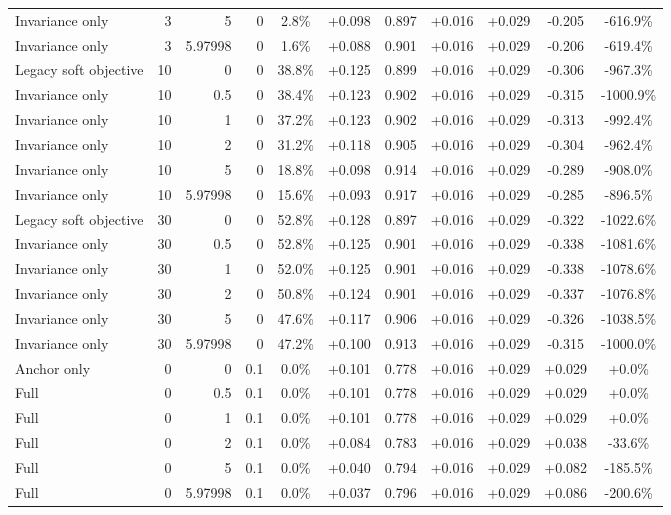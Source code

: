 \begin{table}[htbp]
\begin{tabular}{lrrrccccccc}
Invariance only & 3 & 5 & 0 & 2.8\% & +0.098 & 0.897 & +0.016 & +0.029 & -0.205 & -616.9\% \\
Invariance only & 3 & 5.97998 & 0 & 1.6\% & +0.088 & 0.901 & +0.016 & +0.029 & -0.206 & -619.4\% \\
Legacy soft objective & 10 & 0 & 0 & 38.8\% & +0.125 & 0.899 & +0.016 & +0.029 & -0.306 & -967.3\% \\
Invariance only & 10 & 0.5 & 0 & 38.4\% & +0.123 & 0.902 & +0.016 & +0.029 & -0.315 & -1000.9\% \\
Invariance only & 10 & 1 & 0 & 37.2\% & +0.123 & 0.902 & +0.016 & +0.029 & -0.313 & -992.4\% \\
Invariance only & 10 & 2 & 0 & 31.2\% & +0.118 & 0.905 & +0.016 & +0.029 & -0.304 & -962.4\% \\
Invariance only & 10 & 5 & 0 & 18.8\% & +0.098 & 0.914 & +0.016 & +0.029 & -0.289 & -908.0\% \\
Invariance only & 10 & 5.97998 & 0 & 15.6\% & +0.093 & 0.917 & +0.016 & +0.029 & -0.285 & -896.5\% \\
Legacy soft objective & 30 & 0 & 0 & 52.8\% & +0.128 & 0.897 & +0.016 & +0.029 & -0.322 & -1022.6\% \\
Invariance only & 30 & 0.5 & 0 & 52.8\% & +0.125 & 0.901 & +0.016 & +0.029 & -0.338 & -1081.6\% \\
Invariance only & 30 & 1 & 0 & 52.0\% & +0.125 & 0.901 & +0.016 & +0.029 & -0.338 & -1078.6\% \\
Invariance only & 30 & 2 & 0 & 50.8\% & +0.124 & 0.901 & +0.016 & +0.029 & -0.337 & -1076.8\% \\
Invariance only & 30 & 5 & 0 & 47.6\% & +0.117 & 0.906 & +0.016 & +0.029 & -0.326 & -1038.5\% \\
Invariance only & 30 & 5.97998 & 0 & 47.2\% & +0.100 & 0.913 & +0.016 & +0.029 & -0.315 & -1000.0\% \\
Anchor only & 0 & 0 & 0.1 & 0.0\% & +0.101 & 0.778 & +0.016 & +0.029 & +0.029 & +0.0\% \\
Full & 0 & 0.5 & 0.1 & 0.0\% & +0.101 & 0.778 & +0.016 & +0.029 & +0.029 & +0.0\% \\
Full & 0 & 1 & 0.1 & 0.0\% & +0.101 & 0.778 & +0.016 & +0.029 & +0.029 & +0.0\% \\
Full & 0 & 2 & 0.1 & 0.0\% & +0.084 & 0.783 & +0.016 & +0.029 & +0.038 & -33.6\% \\
Full & 0 & 5 & 0.1 & 0.0\% & +0.040 & 0.794 & +0.016 & +0.029 & +0.082 & -185.5\% \\
Full & 0 & 5.97998 & 0.1 & 0.0\% & +0.037 & 0.796 & +0.016 & +0.029 & +0.086 & -200.6\% \\

\end{tabular}
\end{table}
